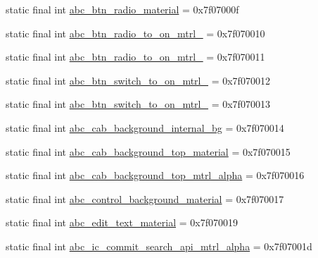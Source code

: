 \begin{DoxyCompactItemize}
\item 
static final int \mbox{\hyperlink{classcom_1_1google_1_1android_1_1gms_1_1R_1_1drawable_a352ba29e47d24cc271b9b4e922df62cc}{abc\+\_\+btn\+\_\+radio\+\_\+material}} = 0x7f07000f
\item 
static final int \mbox{\hyperlink{classcom_1_1google_1_1android_1_1gms_1_1R_1_1drawable_ab9a1cd4336ea8a17b325679290283694}{abc\+\_\+btn\+\_\+radio\+\_\+to\+\_\+on\+\_\+mtrl\+\_}} = 0x7f070010
\item 
static final int \mbox{\hyperlink{classcom_1_1google_1_1android_1_1gms_1_1R_1_1drawable_a2b059cabe28796d9883b3ff0427e2f7f}{abc\+\_\+btn\+\_\+radio\+\_\+to\+\_\+on\+\_\+mtrl\+\_}} = 0x7f070011
\item 
static final int \mbox{\hyperlink{classcom_1_1google_1_1android_1_1gms_1_1R_1_1drawable_a6e1d008743cdb20a42dbbf6e4a692bb9}{abc\+\_\+btn\+\_\+switch\+\_\+to\+\_\+on\+\_\+mtrl\+\_}} = 0x7f070012
\item 
static final int \mbox{\hyperlink{classcom_1_1google_1_1android_1_1gms_1_1R_1_1drawable_a15f77413caa2a7feb4b3dc241f94bb10}{abc\+\_\+btn\+\_\+switch\+\_\+to\+\_\+on\+\_\+mtrl\+\_}} = 0x7f070013
\item 
static final int \mbox{\hyperlink{classcom_1_1google_1_1android_1_1gms_1_1R_1_1drawable_ab3aae57a56f1b572036a44462d0ca128}{abc\+\_\+cab\+\_\+background\+\_\+internal\+\_\+bg}} = 0x7f070014
\item 
static final int \mbox{\hyperlink{classcom_1_1google_1_1android_1_1gms_1_1R_1_1drawable_a3a1fd675cf1efdd98fff8ca388b9782d}{abc\+\_\+cab\+\_\+background\+\_\+top\+\_\+material}} = 0x7f070015
\item 
static final int \mbox{\hyperlink{classcom_1_1google_1_1android_1_1gms_1_1R_1_1drawable_a3280f2e9b11c350fac9a022f17626017}{abc\+\_\+cab\+\_\+background\+\_\+top\+\_\+mtrl\+\_\+alpha}} = 0x7f070016
\item 
static final int \mbox{\hyperlink{classcom_1_1google_1_1android_1_1gms_1_1R_1_1drawable_a64a592bc48bd05ab3bafe2b7daeaf58a}{abc\+\_\+control\+\_\+background\+\_\+material}} = 0x7f070017
\item 
static final int \mbox{\hyperlink{classcom_1_1google_1_1android_1_1gms_1_1R_1_1drawable_a4eb9d2ea5d63872a6ff95d3212a51308}{abc\+\_\+edit\+\_\+text\+\_\+material}} = 0x7f070019
\item 
static final int \mbox{\hyperlink{classcom_1_1google_1_1android_1_1gms_1_1R_1_1drawable_ab7a3da23dd36b398b70f0375844d85fa}{abc\+\_\+ic\+\_\+commit\+\_\+search\+\_\+api\+\_\+mtrl\+\_\+alpha}} = 0x7f07001d

\end{DoxyCompactItemize}
